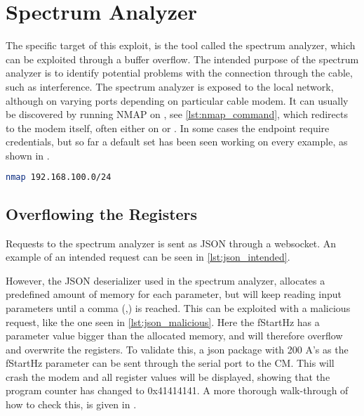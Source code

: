 \chapter{Spectrum Analyzer}
The specific target of this exploit, is the tool called the spectrum analyzer, which can be exploited through a buffer overflow.
The intended purpose of the spectrum analyzer is to identify potential problems with the connection through the cable, such as interference.
The spectrum analyzer is exposed to the local network, although on varying ports depending on particular cable modem.
It can usually be discovered by running NMAP on , see \cref{lst:nmap_command}, which redirects to the modem itself, often either on  or .
In some cases the endpoint require credentials, but so far a default set has been seen working on every example, as shown in .

\begin{lstlisting}[language=sh,firstnumber=1,label={lst:nmap_command},caption={The NMAP request to find the Spectrum Analyser},float]
    nmap 192.168.100.0/24
\end{lstlisting}

\section{Overflowing the Registers}
Requests to the spectrum analyzer is sent as JSON through a websocket. An example of an intended request can be seen in \cref{lst:json_intended}.


However, the JSON deserializer used in the spectrum analyzer, allocates a predefined amount of memory for each parameter, but will keep reading input parameters until a comma (,) is reached.
This can be exploited with a malicious request, like the one seen in \cref{lst:json_malicious}.
Here the fStartHz has a parameter value bigger than the allocated memory, and will therefore overflow and overwrite the registers.
To validate this, a json package with 200 A's as the fStartHz parameter can be sent through the serial port to the CM.
This will crash the modem and all register values will be displayed, showing that the program counter has changed to 0x41414141.
A more thorough walk-through of how to check this, is given in .




